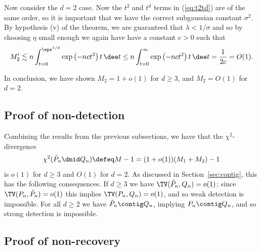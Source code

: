 \documentclass{article}
\begin{document}
Now consider the $d=2$ case. Now the $t^2$ and $t^d$ terms in (\ref{eq:t2td}) are of the same order, so it is important that we have the correct subgaussian constant $\sigma^2$. By hypothesis (v) of the theorem, we are guaranteed that $\lambda < 1/\sigma$ and so by choosing $\eta$ small enough we again have have a constant $c > 0$ such that
$$M_2' \lesssim n \int_{t=0}^{\eps^{1/d}} \exp\left(-nc t^2\right) t \,\dee t
\le n \int_{t=0}^\infty \exp\left(-nc t^2\right) t \,\dee t
= \frac{1}{2c} = O(1).$$

\noindent In conclusion, we have shown $M_2 = 1 + o(1)$ for $d \ge 3$, and $M_2 = O(1)$ for $d = 2$.





\subsection{Proof of non-detection}

Combining the results from the previous subsections, we have that the $\chi^2$-divergence
$$\chi^2(\tilde P_n \dmid Q_n) \defeq M - 1 = (1+o(1)) (M_1 + M_2) - 1$$
is $o(1)$ for $d \ge 3$ and $O(1)$ for $d = 2$. As discussed in Section~\ref{sec:contig}, this has the following consequences. If $d \ge 3$ we have $\TV(\tilde P_n,Q_n) = o(1)$; since $\TV(P_n,\tilde P_n) = o(1)$ this implies $\TV(P_n,Q_n) = o(1)$, and so weak detection is impossible. For all $d \ge 2$ we have $\tilde P_n \contig Q_n$, implying $P_n \contig Q_n$, and so strong detection is impossible.

\subsection{Proof of non-recovery}

\label{sec:pf-non-recovery}
\end{document}

